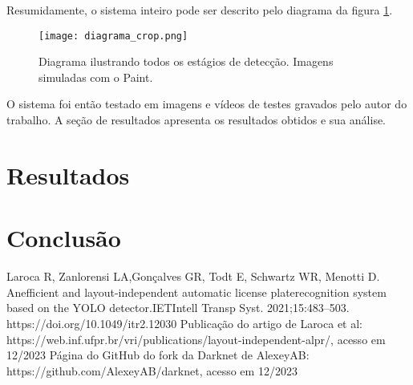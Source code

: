 \documentclass[conference]{IEEEtran}
\begin{document}
Resumidamente, o sistema inteiro pode ser descrito pelo diagrama da figura \ref{fig:diagrama_sistema}.

\begin{figure}
    \centering
    \texttt{[image: diagrama\_crop.png]}
    \caption{Diagrama ilustrando todos os estágios de detecção. Imagens simuladas com o Paint.}
    \label{fig:diagrama_sistema}
\end{figure}

O sistema foi então testado em imagens e vídeos de testes gravados pelo autor do trabalho. A seção de resultados apresenta os resultados obtidos e sua análise.

\section{Resultados}
\label{sec:resultados}

\section{Conclusão}
\label{sec:conclusao}

\begin{thebibliography}{00}
 Laroca R, Zanlorensi LA,Gonçalves GR, Todt E, Schwartz WR, Menotti D. Anefficient and layout-independent automatic license platerecognition system based on the YOLO detector.IETIntell Transp Syst. 2021;15:483–503. https://doi.org/10.1049/itr2.12030
 Publicação do artigo de Laroca et al: https://web.inf.ufpr.br/vri/publications/layout-independent-alpr/, acesso em 12/2023
 Página do GitHub do fork da Darknet de AlexeyAB: https://github.com/AlexeyAB/darknet, acesso em 12/2023
\end{thebibliography}
\end{document}
